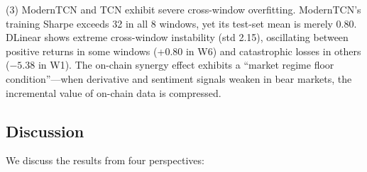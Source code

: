 \documentclass[a4paper]{cas-dc}
\begin{document}
(3) ModernTCN and TCN exhibit severe cross-window overfitting. ModernTCN's training Sharpe exceeds 32 in all 8 windows, yet its test-set mean is merely 0.80. DLinear shows extreme cross-window instability (std 2.15), oscillating between positive returns in some windows (+0.80 in W6) and catastrophic losses in others ($-5.38$ in W1). The on-chain synergy effect exhibits a ``market regime floor condition''---when derivative and sentiment signals weaken in bear markets, the incremental value of on-chain data is compressed.

\subsection{Discussion}

We discuss the results from four perspectives:
\end{document}
